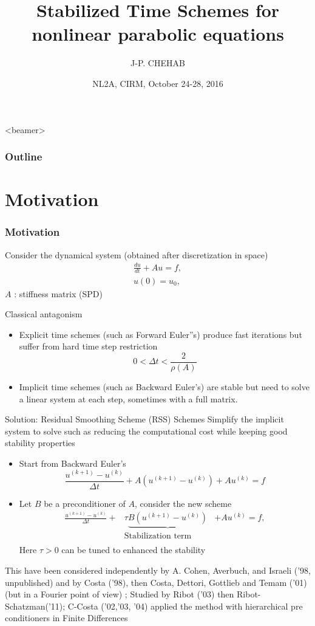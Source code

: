 \documentclass[hyperref={pdfpagemode=FullScreen},9pt]{beamer}
\title{Stabilized Time Schemes for nonlinear parabolic equations}
\author{J-P. CHEHAB\inst{1}}
\institute{
  \inst{1}
  LAMFA, UMR 7352, Universit\'e de Picardie Jules Verne, Amiens, France
(jean-paul.chehab@u-picardie.fr)\\

  }
\date{NL2A, CIRM, October 24-28, 2016}
\newcommand{\Frac}[2] {\frac{\textstyle #1} {\textstyle #2}}
\begin{document}
\frame{\titlepage}

\begin{frame}<beamer>
\frametitle{Outline}
\tableofcontents
\end{frame}


\section{Motivation}
\begin{frame}[label=introduction]
	\frametitle{Motivation}
	Consider the dynamical system (obtained after discretization in space)
	\begin{equation}
\begin{array}{l}
\Frac{du}{dt} +Au=f,\\
u(0)=u_0,
\end{array}
\end{equation}
$A$ : stiffness matrix (SPD)
\pause
	\begin{block}{Classical antagonism}
	\begin{itemize}
	\item Explicit time schemes (such as Forward Euler''s) produce fast iterations but suffer from hard time step restriction
	$$
	0<\Delta t <\Frac{2}{\rho(A)}
	$$
\pause
	\item Implicit time schemes (such as Backward Euler's) are stable but need to solve a linear system at each step, sometimes with a full matrix.
	\end{itemize}
	\end{block}	
\end{frame}
%
\begin{frame}
\begin{block}{Solution: Residual
Smoothing Scheme (RSS) Schemes}
	Simplify the implicit system to solve such as reducing the computational cost while keeping good stability properties
\begin{itemize}
	\item Start from Backward Euler's
	$$
	\Frac{u^{(k+1)}-u^{(k)}}{\Delta t} +A(u^{(k+1)}-u^{(k)})+Au^{(k)}=f
	$$
	\item Let $B$ be a preconditioner of $A$, consider the new scheme
	\begin{equation}
\begin{array}{lcl}
\Frac{u^{(k+1)}-u^{(k)}}{\Delta t}+&\tau
\underbrace{B(u^{(k+1)}-u^{(k)})}&+Au^{(k)}=f,\\
 & \mbox{Stabilization term}& \\
 \end{array}
\end{equation}
Here $\tau>0$ can be tuned to enhanced the stability
       \end{itemize}	
	\end{block}
	\pause
	This have been considered independently by A. Cohen, Averbuch, and Israeli ('98, unpublished) and by
	Costa ('98), then Costa, Dettori, Gottlieb and Temam ('01) (but in a Fourier point of view) ; Studied by Ribot ('03) then Ribot-Schatzman('11); C-Costa ('02,'03, '04) applied the method with hierarchical pre conditioners in Finite Differences
\end{frame}
\end{document}
